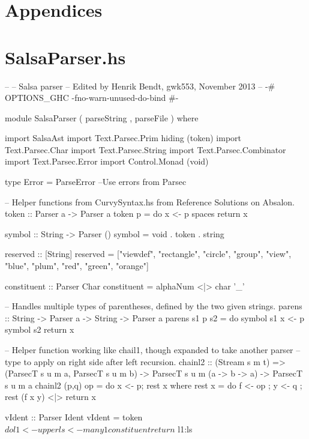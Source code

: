 \documentclass[11pt]{article}
\renewenvironment{verbatim}{}{}
\begin{document}
\section*{Appendices}
\section{SalsaParser.hs}
\begin{verbatim}
\begin{verbatim}
--
-- Salsa parser
-- Edited by Henrik Bendt, gwk553, November 2013
--
{-# OPTIONS_GHC -fno-warn-unused-do-bind #-}

module SalsaParser 
( parseString
, parseFile
) where

import SalsaAst
import Text.Parsec.Prim hiding (token)
import Text.Parsec.Char
import Text.Parsec.String
import Text.Parsec.Combinator
import Text.Parsec.Error
import Control.Monad (void)

type Error = ParseError --Use errors from Parsec

-- Helper functions from CurvySyntax.hs from Reference Solutions on Absalon. 
token :: Parser a -> Parser a
token p = do x <- p
             spaces
             return x

symbol :: String -> Parser ()
symbol = void . token . string

reserved :: [String]
reserved = ["viewdef", "rectangle", "circle", "group", "view", "blue", "plum", 
            "red", "green", "orange"]

constituent :: Parser Char
constituent = alphaNum <|> char '_'

-- Handles multiple types of parentheses, defined by the two given strings.
parens :: String -> Parser a -> String -> Parser a
parens s1 p s2 = do symbol s1
                    x <- p
                    symbol s2
                    return x

-- Helper function working like chail1, though expanded to take another parser 
-- type to apply on right side after left recursion.
chainl2 :: (Stream s m t) => (ParsecT s u m a, ParsecT s u m b) -> 
            ParsecT s u m (a -> b -> a) -> ParsecT s u m a
chainl2 (p,q) op        = do{ x <- p; rest x }
                    where
                      rest x    = do{ f <- op
                                    ; y <- q
                                    ; rest (f x y)
                                    }
                                <|> return x

vIdent :: Parser Ident
vIdent = token $ do
    l1 <- upper
    ls <- many1 constituent
    return $ l1:ls


\end{verbatim}
\end{document}
